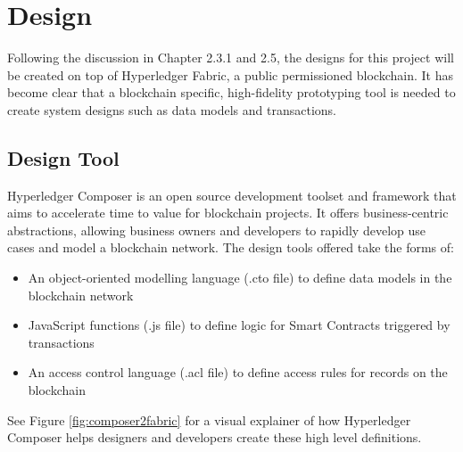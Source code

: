 \chapter{Design}
\graphicspath{{Chapter5/Figs/Raster/}{Chapter5/Figs/Tex/}{Chapter5/Figs/}}

Following the discussion in Chapter 2.3.1 and 2.5, the designs for this project
will be created on top of Hyperledger Fabric, a public permissioned blockchain.
It has become clear that a blockchain specific, high-fidelity prototyping tool is needed
to create system designs such as data models and transactions.

\section{Design Tool}

Hyperledger Composer is an open source development toolset and framework that aims to
accelerate time to value for blockchain projects. It offers business-centric
abstractions, allowing business owners and developers to rapidly develop
use cases and model a blockchain network. The design tools offered take the forms of:
\begin{itemize}
	\setlength\itemsep{0em}
	\item An object-oriented modelling language (.cto file) to define data models in
	      the blockchain network
	\item JavaScript functions (.js file) to define logic for Smart Contracts triggered by transactions
	\item An access control language (.acl file) to define access rules for records on the blockchain\\
	      \citep{official2018composer}
\end{itemize}

See Figure \ref{fig:composer2fabric} for a visual explainer of how Hyperledger Composer
helps designers and developers create these high level definitions.

